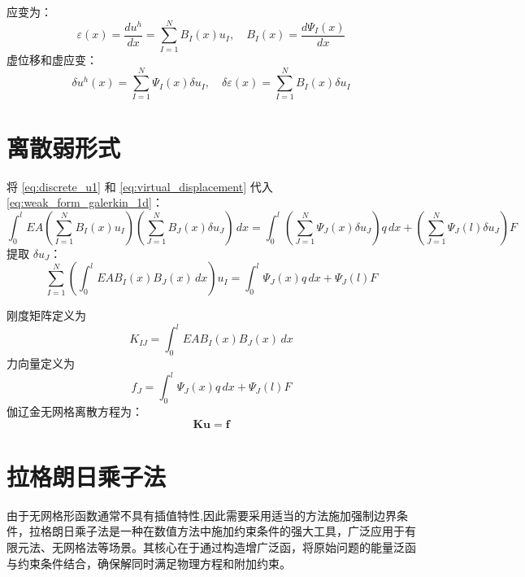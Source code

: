 \documentclass[engineeringmaster]{hquThesis}
\begin{document}
应变为：
\begin{equation}
    \varepsilon(x) = \frac{du^h}{dx} = \sum_{I=1}^N B_I(x) u_I, \quad B_I(x) = \frac{d \Psi_I(x)}{dx}
    \label{eq:discrete_strain}
\end{equation}
虚位移和虚应变：
\begin{equation}
    \delta u^h(x) = \sum_{I=1}^N \Psi_I(x) \delta u_I, \quad \delta \varepsilon(x) = \sum_{I=1}^N B_I(x) \delta u_I
    \label{eq:virtual_displacement}
\end{equation}

\section{离散弱形式}

将 \eqref{eq:discrete_u1} 和 \eqref{eq:virtual_displacement} 代入 \eqref{eq:weak_form_galerkin_1d}：
\[
    \int_0^l EA \left( \sum_{I=1}^N B_I(x) u_I \right) \left( \sum_{J=1}^N B_J(x) \delta u_J \right) \, dx = \int_0^l \left( \sum_{J=1}^N \Psi_J(x) \delta u_J \right) q \, dx + \left( \sum_{J=1}^N \Psi_J(l) \delta u_J \right) F
    \label{eq:weak_form_discrete}
\]
提取 \( \delta u_J \)：
\begin{equation}
    \sum_{I=1}^N \left( \int_0^l EA B_I(x) B_J(x) \, dx \right) u_I = \int_0^l \Psi_J(x) q \, dx + \Psi_J(l) F
    \label{eq:discrete_equation}
\end{equation}

\noindent
刚度矩阵定义为
\begin{equation}
    K_{IJ} = \int_0^l EA B_I(x) B_J(x) \, dx
    \label{eq:stiffness_matrix}
\end{equation}
力向量定义为
\begin{equation}
    f_J = \int_0^l \Psi_J(x) q \, dx + \Psi_J(l) F
    \label{eq:force_vector}
\end{equation}
伽辽金无网格离散方程为：
\begin{equation}
    \boldsymbol{K} \boldsymbol{u} = \boldsymbol{f}
    \label{eq:galerkin_meshless}
\end{equation}


\newpage
\section{拉格朗日乘子法}

由于无网格形函数通常不具有插值特性,因此需要采用适当的方法施加强制边界条件，拉格朗日乘子法是一种在数值方法中施加约束条件的强大工具，广泛应用于有限元法、无网格法等场景。其核心在于通过构造增广泛函，将原始问题的能量泛函与约束条件结合，确保解同时满足物理方程和附加约束。
\end{document}
